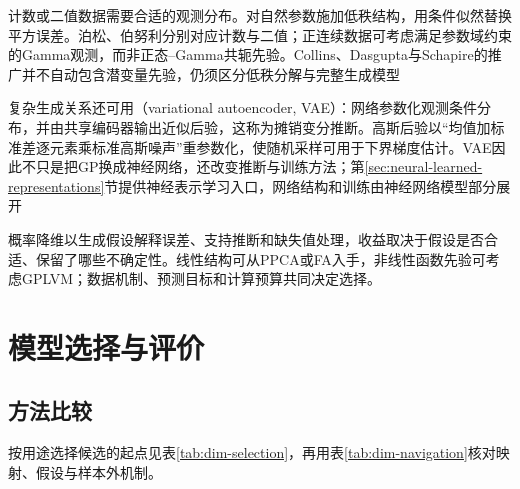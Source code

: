计数或二值数据需要合适的观测分布。对自然参数施加低秩结构，用条件似然替换平方误差。泊松、伯努利分别对应计数与二值；正连续数据可考虑满足参数域约束的Gamma观测，而非正态--Gamma共轭先验。Collins、Dasgupta与Schapire的推广并不自动包含潜变量先验，仍须区分低秩分解与完整生成模型

复杂生成关系还可用（variational autoencoder, VAE）：网络参数化观测条件分布，并由共享编码器输出近似后验，这称为摊销变分推断。高斯后验以“均值加标准差逐元素乘标准高斯噪声”重参数化，使随机采样可用于下界梯度估计。VAE因此不只是把GP换成神经网络，还改变推断与训练方法；第\ref{sec:neural-learned-representations}节提供神经表示学习入口，网络结构和训练由神经网络模型部分展开

概率降维以生成假设解释误差、支持推断和缺失值处理，收益取决于假设是否合适、保留了哪些不确定性。线性结构可从PPCA或FA入手，非线性函数先验可考虑GPLVM；数据机制、预测目标和计算预算共同决定选择。

\section{模型选择与评价}
\label{sec:dim-evaluation}

\subsection{方法比较}

按用途选择候选的起点见表\ref{tab:dim-selection}，再用表\ref{tab:dim-navigation}核对映射、假设与样本外机制。

